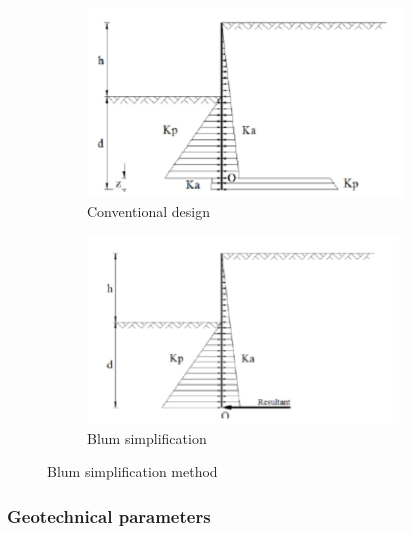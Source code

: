 \begin{figure}[H]
    \centering
    \begin{subfigure}[b]{0.45\textwidth}
        \includegraphics[width=\linewidth, height=5cm]{figures/ch8/blum_1.png}
        \caption{Conventional design}
        \label{fig:conventional_design}
    \end{subfigure}
    \hfill
    \begin{subfigure}[b]{0.45\textwidth}
        \includegraphics[width=\linewidth, height=5cm]{figures/ch8/blum_2.png}
        \caption{Blum simplification}
        \label{fig:blum_simplification}
    \end{subfigure}
    \caption{Blum simplification method}
    \label{fig:blum}
\end{figure}



\subsubsection{Geotechnical parameters}

